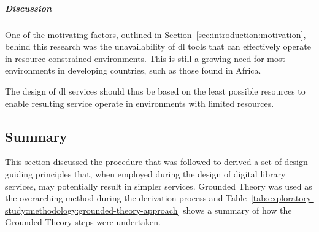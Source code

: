 \subparagraph{Discussion} One of the motivating factors, outlined in Section~\ref{sec:introduction:motivation}, behind this research was the
unavailability of \gls{dl} tools that can effectively operate in
resource constrained environments. This is still a growing need for most
environments in developing countries, such as those found in Africa.

The design of \gls{dl} services should thus be based on the least
possible resources to enable resulting service operate in environments with
limited resources.

\subsection{Summary}
\label{sec:exploratory-study:methodology:summary}

This section discussed the procedure that was followed to derived a set of
design guiding principles that, when employed during the design of digital
library services, may potentially result in simpler services. Grounded Theory
was used as the overarching method during the derivation process and Table~\ref{tab:exploratory-study:methodology:grounded-theory-approach} shows a
summary of how the Grounded Theory steps were undertaken.

\tablespacing

\bodyspacing